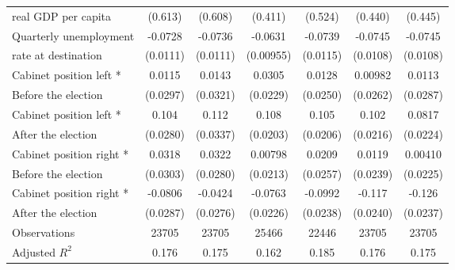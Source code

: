 \begin{table}[htbp]
\begin{tabular}{l*{6}{c}}
real GDP per capita                    &     (0.613)         &     (0.608)         &     (0.411)         &     (0.524)         &     (0.440)         &     (0.445)         \\
[0,5em]
Quarterly unemployment&     -0.0728\sym{***}&     -0.0736\sym{***}&     -0.0631\sym{***}&     -0.0739\sym{***}&     -0.0745\sym{***}&     -0.0745\sym{***}\\
rate at destination                    &    (0.0111)         &    (0.0111)         &   (0.00955)         &    (0.0115)         &    (0.0108)         &    (0.0108)         \\
[0,5em]
Cabinet position left * &      0.0115         &      0.0143         &      0.0305         &      0.0128         &     0.00982         &      0.0113         \\
Before the election                    &    (0.0297)         &    (0.0321)         &    (0.0229)         &    (0.0250)         &    (0.0262)         &    (0.0287)         \\
[0,5em]
Cabinet position left * &       0.104\sym{***}&       0.112\sym{***}&       0.108\sym{***}&       0.105\sym{***}&       0.102\sym{***}&      0.0817\sym{***}\\
After the election                    &    (0.0280)         &    (0.0337)         &    (0.0203)         &    (0.0206)         &    (0.0216)         &    (0.0224)         \\
[0,5em]
Cabinet position right * &      0.0318         &      0.0322         &     0.00798         &      0.0209         &      0.0119         &     0.00410         \\
Before the election                    &    (0.0303)         &    (0.0280)         &    (0.0213)         &    (0.0257)         &    (0.0239)         &    (0.0225)         \\
[0,5em]
Cabinet position right *&     -0.0806\sym{**} &     -0.0424         &     -0.0763\sym{**} &     -0.0992\sym{***}&      -0.117\sym{***}&      -0.126\sym{***}\\
 After the election                    &    (0.0287)         &    (0.0276)         &    (0.0226)         &    (0.0238)         &    (0.0240)         &    (0.0237)         \\
\hline
Observations        &       23705         &       23705         &       25466         &       22446         &       23705         &       23705         \\
Adjusted \(R^{2}\)  &       0.176         &       0.175         &       0.162         &       0.185         &       0.176         &       0.175         \\

\end{tabular}
\end{table}
